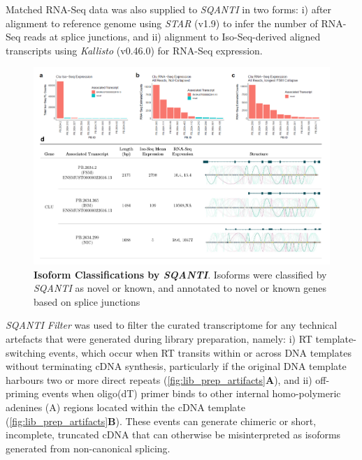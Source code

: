 Matched RNA-Seq data was also supplied to \textit{SQANTI} in two forms: i) after alignment to reference genome using \textit{STAR}\cite{Dobin2013} (v1.9) to infer the number of RNA-Seq reads at splice junctions, and ii) alignment to Iso-Seq-derived aligned transcripts using \textit{Kallisto}\cite{Bray2016} (v0.46.0) for RNA-Seq expression.  

\begin{landscape}
	\begin{figure}[h]
		\centering
		\includegraphics[page=3,trim={0 4cm 0 0},clip,scale = 0.9]{Figures/ProjectDevelopment_Figures_Landscape}
		\captionsetup{width=1.5\textwidth}
		\caption[Isoform Classifications by \textit{SQANTI}]%
		{\textbf{Isoform Classifications by \textit{SQANTI}}. Isoforms were classified by \textit{SQANTI} as novel or known, and annotated to novel or known genes based on splice junctions}
		\label{fig:sqanti_cate}
	\end{figure}
\end{landscape}

\textit{SQANTI Filter} was used to filter the curated transcriptome for any technical artefacts that were generated during library preparation, namely: i) RT template-switching events, which occur when RT transits within or across DNA templates without terminating cDNA synthesis, particularly if the original DNA template harbours two or more direct repeats\cite{Cocquet2006} (\cref{fig:lib_prep_artifacts}\textbf{A}), and ii) off-priming events when oligo(dT) primer binds to other internal homo-polymeric adenines (A) regions located within the cDNA template\cite{Conesa2016} (\cref{fig:lib_prep_artifacts}\textbf{B}). These events can generate chimeric or short, incomplete, truncated cDNA that can otherwise be misinterpreted as isoforms generated from non-canonical splicing\cite{Houseley2010}. 

